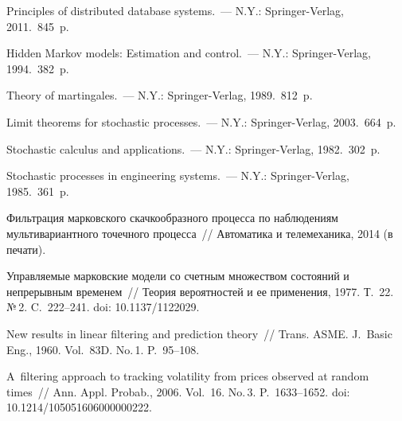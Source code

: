 \begin{multicols}{2}
{{\begin{thebibliography}{99}
 Principles of distributed database systems.~---
N.Y.: Springer-Verlag, 2011.~845~p.

 Hidden Markov models:
Estimation and control.~--- N.Y.: Springer-Verlag, 1994.~382~p.

 Theory of martingales.~---
N.Y.: Springer-Verlag, 1989.~812~p.

 Limit theorems for stochastic processes.~---
N.Y.: Springer-Verlag, 2003.~664~p.

 Stochastic calculus and applications.~---
N.Y.: Springer-Verlag, 1982.~302~p.

 Stochastic processes in engineering
systems.~--- N.Y.: Springer-Verlag, 1985.~361~p.

Фильт\-ра\-ция марковского скачкообразного процесса по
наблюдениям мультивариантного точечного процесса~//
Автоматика и телемеханика, 2014 (в печати).

\medskip

 Управляемые марковские модели со счетным множеством состояний
и непрерывным временем~// Теория вероятностей и ее применения, 1977. Т.~22. №\,2. C.~222--241.
doi: 10.1137/1122029.

\medskip

 New results in linear filtering and
prediction theory~// Trans. ASME. J.~Basic Eng., 1960. Vol.~83D. No.\,1. P.~95--108.

\medskip


 A~filtering approach to
tracking volatility from prices observed at random times~//
Ann. Appl. Probab., 2006. Vol.~16. No.\,3. P.~1633--1652.
doi: 10.1214/105051606000000222.
 \end{thebibliography}

 }
 }

\end{multicols}

